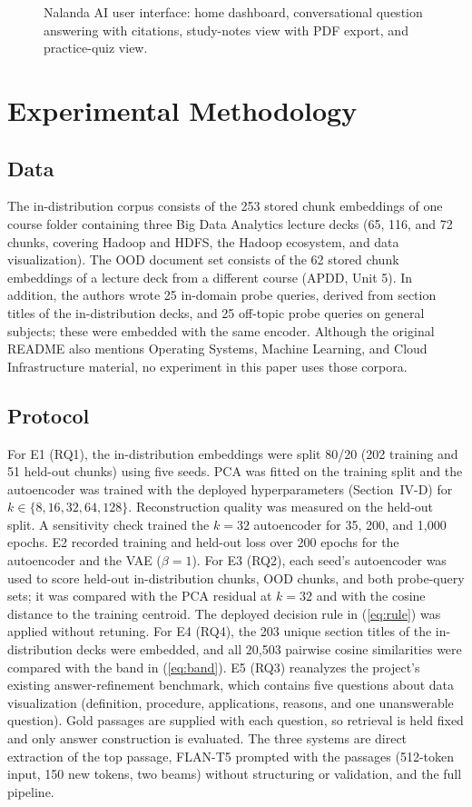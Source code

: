 \documentclass[conference]{IEEEtran}
\newcommand{\figplaceholder}[2]{\fbox{\parbox[c][#1][c]{0.97#2}{\centering\color{gray}\footnotesize Reserved space for figure}}}
\begin{document}
\begin{figure}[!t]
\centering
\figplaceholder{2.8in}{\textwidth}
\caption{Nalanda AI user interface: home dashboard, conversational question answering with citations, study-notes view with PDF export, and practice-quiz view.}
\label{fig:ui}
\end{figure}
\section{Experimental Methodology}
\subsection{Data}
The in-distribution corpus consists of the 253 stored chunk embeddings of one course folder containing three Big Data Analytics lecture decks (65, 116, and 72 chunks, covering Hadoop and HDFS, the Hadoop ecosystem, and data visualization). The OOD document set consists of the 62 stored chunk embeddings of a lecture deck from a different course (APDD, Unit 5). In addition, the authors wrote 25 in-domain probe queries, derived from section titles of the in-distribution decks, and 25 off-topic probe queries on general subjects; these were embedded with the same encoder. Although the original README also mentions Operating Systems, Machine Learning, and Cloud Infrastructure material, no experiment in this paper uses those corpora.

\subsection{Protocol}
For E1 (RQ1), the in-distribution embeddings were split 80/20 (202 training and 51 held-out chunks) using five seeds. PCA was fitted on the training split and the autoencoder was trained with the deployed hyperparameters (Section~IV-D) for $k\in\{8,16,32,64,128\}$. Reconstruction quality was measured on the held-out split. A sensitivity check trained the $k=32$ autoencoder for 35, 200, and 1{,}000 epochs. E2 recorded training and held-out loss over 200 epochs for the autoencoder and the VAE ($\beta=1$). For E3 (RQ2), each seed's autoencoder was used to score held-out in-distribution chunks, OOD chunks, and both probe-query sets; it was compared with the PCA residual at $k=32$ and with the cosine distance to the training centroid. The deployed decision rule in (\ref{eq:rule}) was applied without retuning. For E4 (RQ4), the 203 unique section titles of the in-distribution decks were embedded, and all 20{,}503 pairwise cosine similarities were compared with the band in (\ref{eq:band}). E5 (RQ3) reanalyzes the project's existing answer-refinement benchmark, which contains five questions about data visualization (definition, procedure, applications, reasons, and one unanswerable question). Gold passages are supplied with each question, so retrieval is held fixed and only answer construction is evaluated. The three systems are direct extraction of the top passage, FLAN-T5 prompted with the passages (512-token input, 150 new tokens, two beams) without structuring or validation, and the full pipeline.
\end{document}
